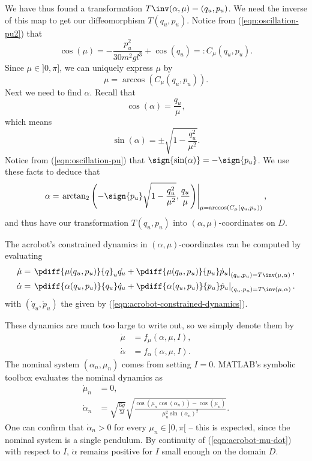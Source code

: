 We have thus found a transformation \(T\inv(\alpha,\mu) = (q_u,p_u)\).
We need the inverse of this map to get our diffeomorphism \(T(q_u,p_u)\).
Notice from (\ref{eqn:oscillation-pu2}) that
\[
    \cos(\mu) = -\frac{p_u^2}{30m^2gl^3} + \cos(q_u) =: C_\mu(q_u,p_u)
    .
\]
Since \(\mu \in ]0,\pi]\), we can uniquely express \(\mu\) by
\begin{equation}\label{eqn:mu-qupu}
    \mu = \arccos\left(C_\mu(q_u,p_u)\right)
    .
\end{equation}
Next we need to find \(\alpha\). 
Recall that 
\[
    \cos(\alpha) = \frac{q_u}{\mu}
    ,
\] 
which means 
\[
    \sin(\alpha) = \pm \sqrt{1 - \frac{q_u^2}{\mu^2}}
    .
\]
Notice from (\ref{eqn:oscillation-pu}) that 
\(\sign{\sin(\alpha)} = -\sign{p_u}\).
We use these facts to deduce that
\begin{equation}\label{eqn:alpha-qupu}
    \alpha = \left.
        \arctan_2\left( -\sign{p_u}\sqrt{1 - \frac{q_u^2}{\mu^2}}, \frac{q_u}{\mu}\right)
        \right|_{\mu = \arccos(C_\mu(q_u,p_u))}
    ,
\end{equation}
and thus have our transformation \(T(q_u,p_u)\) into
\((\alpha,\mu)\)-coordinates on \(D\).

The acrobot's constrained dynamics in
\((\alpha,\mu)\)-coordinates can be computed by evaluating
\begin{align*}
    \dot{\mu} &= \left.\pdiff{\mu(q_u,p_u)}{q}_u\dot{q_u} +
         \pdiff{\mu(q_u,p_u)}{p_u}\dot{p}_u
         \right|_{(q_u,p_u) = T\inv(\mu,\alpha)}
    , \\
    \dot{\alpha} &= \left.\pdiff{\alpha(q_u,p_u)}{q_u}\dot{q}_u + 
        \pdiff{\alpha(q_u,p_u)}{p_u}\dot{p}_u
        \right|_{(q_u,p_u) = T\inv(\mu,\alpha)}
    .
\end{align*}
with \((\dot{q}_u,\dot{p}_u)\) the given by 
 (\ref{eqn:acrobot-constrained-dynamics}).

These dynamics are much too large to write out, so we simply denote them by
\begin{align}\label{eqn:acrobot-mu-dot}
    \dot{\mu} &= f_\mu(\alpha,\mu,I)
    ,\\
    \label{eqn:acrobot-alpha-dot}
    \dot{\alpha} &= f_\alpha(\alpha,\mu,I)
    .
\end{align}
The nominal system \((\alpha_n,\mu_n)\) comes from setting \(I = 0\).
MATLAB's symbolic toolbox evaluates the nominal dynamics as
\begin{align}\label{eqn:acrobot-mu-dot-nom}
    \dot{\mu}_n &= 0
    , \\
    \label{eqn:acrobot-alpha-dot-nom}
    \dot{\alpha}_n &= \sqrt{\frac{6g}{5l}} 
        \sqrt{\frac{\cos(\mu_n\cos(\alpha_n)) - \cos(\mu_n)}
            {\mu_n^2 \sin(\alpha_n)^2}}
    .
\end{align}
One can confirm that \(\dot{\alpha}_n > 0\) for every \(\mu_n \in ]0,\pi[\) -- this
is expected, since the nominal system is a single pendulum.
By continuity of (\ref{eqn:acrobot-mu-dot}) with respect to \(I\), 
\(\dot{\alpha}\) remains positive for \(I\) small enough on the domain \(D\).

